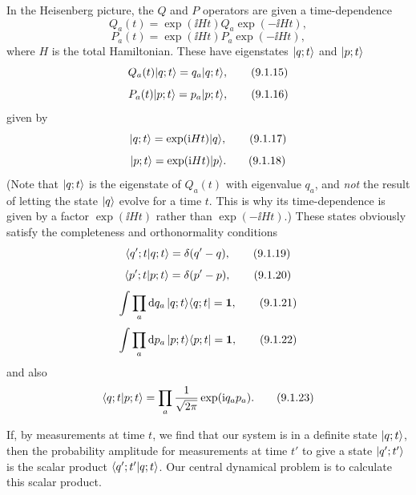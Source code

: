In the Heisenberg picture, the $Q$ and $P$ operators are given a
time-dependence
\begin{equation}
  Q_a(t)=\exp(\ii Ht)Q_a\exp(-\ii Ht),
  \tag{9.1.13}\label{eq:9.1.13}
\end{equation}
\begin{equation}
  P_a(t)=\exp(\ii Ht)P_a\exp(-\ii Ht),
  \tag{9.1.14}\label{eq:9.1.14}
\end{equation}
where $H$ is the total Hamiltonian. These have eigenstates $\lvert q;t\rangle$ and
$\lvert p;t\rangle$
\begin{equation}
  Q_a(t)\lvert q;t\rangle=q_a\lvert q;t\rangle,
  \tag{9.1.15}\label{eq:9.1.15}
\end{equation}
\begin{equation}
  P_a(t)\lvert p;t\rangle=p_a\lvert p;t\rangle,
  \tag{9.1.16}\label{eq:9.1.16}
\end{equation}
given by
\begin{equation}
  \lvert q;t\rangle=\exp(\mathrm{i} Ht)\lvert q\rangle,
  \tag{9.1.17}\label{eq:9.1.17}
\end{equation}
\begin{equation}
  \lvert p;t\rangle=\exp(\mathrm{i} Ht)\lvert p\rangle.
  \tag{9.1.18}\label{eq:9.1.18}
\end{equation}
(Note that $\lvert q;t\rangle$ is the eigenstate of $Q_a(t)$ with eigenvalue $q_a$,
and \emph{not} the result of letting the state $\lvert q\rangle$ evolve for a time
$t$. This is why its time-dependence is given by a factor $\exp(\ii Ht)$ rather
than $\exp(-\ii Ht)$.) These states obviously satisfy the completeness and
orthonormality conditions
\begin{equation}
  \langle q';t | q;t\rangle=\delta(q'-q),
  \tag{9.1.19}\label{eq:9.1.19}
\end{equation}
\begin{equation}
  \langle p';t | p;t\rangle=\delta(p'-p),
  \tag{9.1.20}\label{eq:9.1.20}
\end{equation}
\begin{equation}
  \int\prod_a \mathop{}\!\mathrm{d} q_a\,\lvert q;t\rangle\langle q;t\rvert=\mathbf{1},
  \tag{9.1.21}\label{eq:9.1.21}
\end{equation}
\begin{equation}
  \int\prod_a \mathop{}\!\mathrm{d} p_a\,\lvert p;t\rangle\langle p;t\rvert=\mathbf{1},
  \tag{9.1.22}\label{eq:9.1.22}
\end{equation}
and also
\begin{equation}
  \langle q;t | p;t\rangle=\prod_a\frac{1}{\sqrt{2\pi}}\exp(\mathrm{i} q_ap_a).
  \tag{9.1.23}\label{eq:9.1.23}
\end{equation}

If, by measurements at time $t$, we find that our system is in a definite
state $\lvert q;t\rangle$, then the probability amplitude for measurements at time
$t'$ to give a state $\lvert q';t'\rangle$ is the scalar product
$\langle q';t' | q;t\rangle$. Our central dynamical problem is to calculate this
scalar product.

